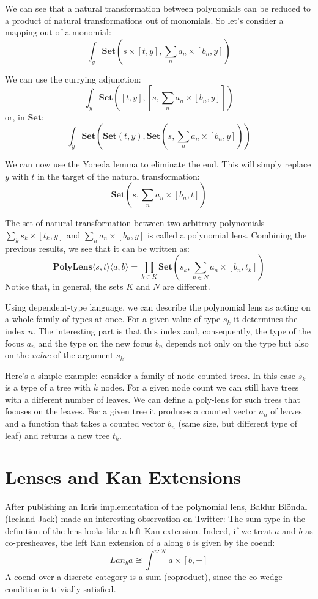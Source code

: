 \documentclass[11pt]{amsart}
\begin{document}
We can see that a natural transformation between polynomials can be reduced to a product of natural transformations out of monomials. So let's consider a mapping out of a monomial:
\[ \int_y \mathbf{Set} \left( s \times [t, y], \sum_n a_n \times [b_n, y]\right) \]
 
 We can use the currying adjunction:
\[ \int_y \mathbf{Set} \left( 
    [t, y],  \left[s, \sum_n a_n \times [b_n, y]\right]  \right) \]
 or, in $\mathbf{Set}$:
 \[ \int_y \mathbf{Set} \left( 
    \mathbf{Set}(t, y), \mathbf{Set} \left(s, \sum_n a_n \times [b_n, y]\right)  \right) \]

 We can now use the Yoneda lemma to eliminate the end. This will simply replace $y$ with $t$ in the target of the natural transformation:
 \[ \mathbf{Set}\left(s, \sum_n a_n \times [b_n, t] \right) \]
 
The set of natural transformation between two arbitrary polynomials $\sum_k s_k \times [t_k, y]$ and $\sum_n a_n \times [b_n, y]$ is called a polynomial lens. Combining the previous results, we see that it can be written as:
 \[ \mathbf{PolyLens}\langle s, t\rangle \langle a, b\rangle = \prod_{k \in K} \mathbf{Set}\left(s_k, \sum_{n \in N} a_n \times [b_n, t_k] \right) \]
Notice that, in general, the sets $K$ and $N$ are different. 

Using dependent-type language, we can describe the polynomial lens as acting on a whole family of types at once. For a given value of type $s_k$ it determines the index $n$. The interesting part is that this index and, consequently, the type of the focus $a_n$ and the type on the new focus $b_n$ depends not only on the type but also on the \emph{value} of the argument $s_k$. 

Here's a simple example: consider a family of node-counted trees. In this case $s_k$ is a type of a tree with $k$ nodes. For a given node count we can still have trees with a different number of leaves. We can define a poly-lens for such trees that focuses on the leaves. For a given tree it produces a counted vector $a_n$ of leaves and a function that takes a counted vector $b_n$  (same size, but different type of leaf) and returns a new tree $t_k$. 

\section{Lenses and Kan Extensions}
After publishing an Idris implementation of the polynomial lens, Baldur Blöndal (Iceland Jack) made an interesting observation on Twitter: The sum type in the definition of the lens looks like a left Kan extension. Indeed, if we treat $a$ and $b$ as co-presheaves, the left Kan extension of $a$ along $b$ is given by the coend:
\[ Lan_b a \cong \int^{n \colon \mathcal{N}} a \times [b, -] \]
A coend over a discrete category is a sum (coproduct), since the co-wedge condition is trivially satisfied. 
\end{document}
